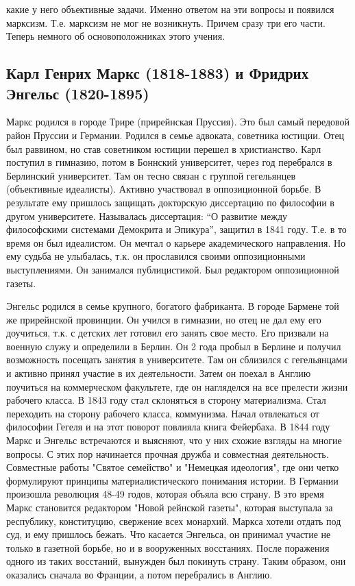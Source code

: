 какие у него объективные задачи. Именно ответом на эти вопросы и появился марксизм. Т.е. марксизм не мог не возникнуть. Причем сразу три его части. Теперь немного об основоположниках этого учения.
\subsection{Карл Генрих Маркс (1818-1883) и Фридрих Энгельс (1820-1895)}

Маркс родился в городе Трире (прирейнская Пруссия). Это был самый передовой район Пруссии и Германии. Родился в семье адвоката, советника юстиции. Отец был раввином, но став советником юстиции перешел в христианство. Карл поступил в гимназию, потом в Боннский университет, через год перебрался в Берлинский университет. Там он тесно связан с группой гегельянцев (объективные идеалисты). Активно участвовал в оппозиционной борьбе. В результате ему пришлось защищать докторскую диссертацию по философии в другом университете. Называлась диссертация: “О развитие между философскими системами Демокрита и Эпикура”, защитил в 1841 году. Т.е. в то время он был идеалистом. Он мечтал о карьере академического направления. Но ему судьба не улыбалась, т.к. он прославился своими оппозиционными выступлениями. Он занимался публицистикой. Был редактором оппозиционной газеты.

Энгельс родился в семье крупного, богатого фабриканта. В городе Бармене той же прирейнской провинции. Он учился в гимназии, но отец не дал ему его доучиться, т.к. с детских лет готовил его занять свое место. Его призвали на военную служу и определили в Берлин. Он 2 года пробыл в Берлине и получил возможность посещать занятия в университете. Там он сблизился с гегельянцами и активно принял участие в их деятельности. Затем он поехал в Англию поучиться на коммерческом факультете, где он нагляделся на все прелести жизни рабочего класса. В 1843 году стал склоняться в сторону материализма. Стал переходить на сторону рабочего класса, коммунизма. Начал отвлекаться от философии Гегеля и на этот поворот повлияла книга Фейербаха. В 1844 году Маркс и Энгельс встречаются и выясняют, что у них схожие взгляды на многие вопросы. С этих пор начинается прочная дружба и совместная деятельность. Совместные работы "Святое семейство" и "Немецкая идеология", где они четко формулируют принципы материалистического понимания истории. В Германии произошла революция 48-49 годов, которая объяла всю страну. В это время Маркс становится редактором "Новой рейнской газеты", которая выступала за республику, конституцию, свержение всех монархий. Маркса хотели отдать под суд, и ему пришлось бежать. Что касается Энгельса, он принимал участие не только в газетной борьбе, но и в вооруженных восстаниях. После поражения одного из таких восстаний, вынужден был покинуть страну. Таким образом, они оказались сначала во Франции, а потом перебрались в Англию.
